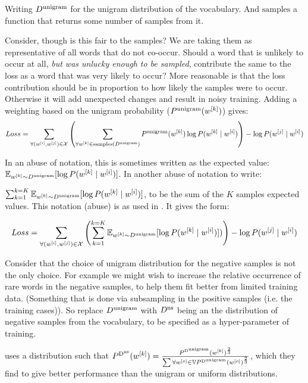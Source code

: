 \documentclass[parskip]{komatufte}
\begin{document}
Writing $\d D_{unigram}$ for the unigram distribution of the vocabulary.
And $\text{samples}$ a function that returns some number of samples from it.

Consider, though is this fair to the samples?
We are taking them as representative of all words that do not co-occur.
Should a word that is unlikely to occur at all, \emph{but was unlucky enough to be sampled}, contribute the same to the loss as a word that was very likely to occur?
More reasonable is that the loss contribution should be in proportion to how likely the samples were to occur.
Otherwise it will add unexpected changes and result in noisy training.
Adding a weighting based on the unigram probability ($\d P_{unigram}(\n w_k)$) gives:
%
\begin{equation}
Loss = \sum_{\forall (\n w_i,\n w_j)\in \seq{X}} 
\left(\sum_{\forall \n w_k \in \text{samples}(\d D_{unigram})}
\d P_{unigram}(\n w_k) \log P(\n w_k\mid \n w_i) \right)
-\log P(\n w_j\mid \n w_i)
\end{equation}

In an abuse of notation, this is sometimes written as the expected value: $\mathbb{E}_{\n w_k \sim \d D_{unigram}} [\log P(\n w_k\mid \n w_i)]$.
In another abuse of notation to write:

$\sum_{k=1}^{k=K} \mathbb{E}_{\n w_k \sim \d D_{unigram}} [\log P(\n w_k\mid \n w_i)]$,
to be the sum of the $K$ samples expected values.
This notation (abuse) is as used in .
It gives the form:

\begin{equation}
Loss = \sum_{\forall (\n w_i,\n w_j)\in \seq{X}} 
\left(\sum_{k=1}^{k=K} \mathbb{E}_{\n w_k \sim \d D_{unigram}} [\log P(\n w_k\mid \n w_i)]) \right)
-\log P(\n w_j\mid \n w_i)
\end{equation}

Consider that the choice of unigram distribution for the negative samples is not the only choice.
For example we might wish to increase the relative occurrence of rare words in the negative samples, to help them fit better from limited training data.
(Something that is done via subsampling in the positive samples (i.e. the training cases)).
So replace $\d D_{unigram}$ with $\d D_{ns}$ being an the distribution of negative samples from the vocabulary,
to be specified as a hyper-parameter of training.

 uses a distribution such that $\d P_{\d D_{ns}}(\n w_k) =  \frac{\d P_{\d D_{unigram}}(\n w_k)^{\frac{2}{3}}}{\sum {\forall \n w_o\in \set{V}} \d P_{\d D_{unigram}}(\n w_o)^{\frac{2}{3}}}$,
which they find to give better performance than the unigram or uniform distributions.
\end{document}
